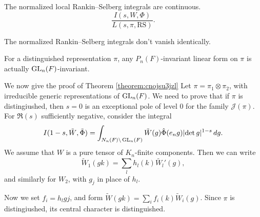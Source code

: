 \documentclass[reqno]{amsart} 
\begin{document}
\begin{proposition}
  The normalized local Rankin--Selberg integrals are continuous.
  \begin{equation*}
    \frac{I(s, W, \Phi)}{L(s, \pi, \mathrm{RS})}.
  \end{equation*}
\end{proposition}
\begin{proposition}
  The normalized Rankin--Selberg integrals don't vanish identically.
\end{proposition}
\begin{proposition}
  For a distinguished representation $\pi$, any $P_n(F)$-invariant linear form on $\pi$ is actually $\operatorname{GL}_n(F)$-invariant.
\end{proposition}

We now give the proof of Theorem \ref{theorem:cnojsu3jzl}  Let $\pi = \pi_1 \otimes \pi_2$, with irreducible generic representations of $\operatorname{GL}_n(F)$.  We need to prove that if $\pi$ is distingiushed, then $s = 0$ is an exceptional pole of level $0$ for the family $\mathcal{J}(\pi)$.  For $\Re(s)$ sufficiently negative, consider the integral
\begin{equation*}
  I(1 - s, \tilde{W},\tilde{\Phi}) = \int_{N_n(F) \backslash \operatorname{GL}_n(F)}
  \tilde{W}(g) \hat{\Phi}(e_n g) \lvert \det g \rvert^{1 - s} \, d g.
\end{equation*}
We assume that $W$ is a pure tensor of $K_n$-finite components.  Then we can write
\begin{equation*}
  \tilde{W}_1(g k) = \sum_l h_l(k) \tilde{W_l} '(g),
\end{equation*}
and similarly for $W_2$, with $g_j$ in place of $h_l$.

Now we set $f_i = h_l g j$, and form $\tilde{W}(g k) = \sum_i f_i(k) \tilde{W}_i(g)$.  Since $\pi$ is distingiushed, its central character is distinguished.
\end{document}
